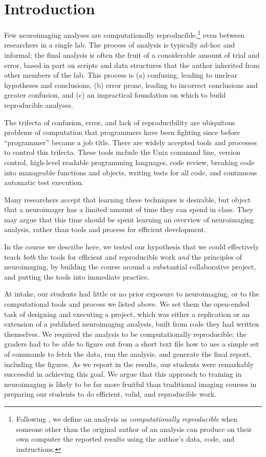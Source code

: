 \section{Introduction}

Few neuroimaging analyses are computationally reproducible,\footnote{Following
\citet{buckheit1995wavelab}, we define an analysis as \emph{computationally
reproducible} when someone other than the original author of an analysis can
produce on their own computer the reported results using the author's data,
code, and instructions.}
even between researchers in a single lab.
The process of analysis is typically ad-hoc and informal; the final analysis
is often the fruit of a considerable amount of trial and error, based in part
on scripts and data structures that the author inherited from other members of
the lab.
This process is
(a) confusing, leading to unclear hypotheses and conclusions,
(b) error prone, leading to incorrect conclusions and greater confusion,
and (c) an impractical foundation on which to build reproducible analyses.

The trifecta of confusion, error, and lack of reproducibility are ubiquitous
problems of computation that programmers have been fighting since before ``programmer''
became a job title. There are widely accepted tools and processes to
control this trifecta. These tools include the Unix command line, version
control, high-level readable programming languages, code review, breaking code
into manageable functions and objects, writing tests for all code,  and
continuous automatic test execution.

Many researchers accept that learning these techniques is desirable, but
object that a neuroimager has a limited amount of time they can spend in
class.  They may argue that this time should be spent learning an overview of
neuroimaging analysis, rather than tools and process for efficient
development.

In the course we describe here, we tested our hypothesis that we could
effectively teach \emph{both} the tools for efficient and reproducible work \emph{and}
the principles of neuroimaging, by building the course around a substantial
collaborative project, and putting the tools into immediate practice.

At intake, our students had little or no prior exposure to neuroimaging,
or to the computational tools and process we listed above.  We set them the
open-ended task of designing and executing a project, which was either a
replication or an extension of a published neuroimaging analysis, built from
code they had written themselves.  We required the analysis to be computationally
reproducible; the graders had to be able to figure out from a short text file
how to use a simple set of commands to
fetch the data, run the analysis, and generate the final report, including the
figures.  As we report in the results, our students were remarkably
successful in achieving this goal.  We argue that this approach to
training in neuroimaging is likely to be far more fruitful than traditional
imaging courses in preparing our students to do efficient, valid, and
reproducible work.


